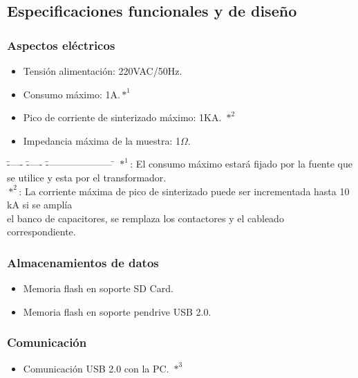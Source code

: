   \subsection{Especificaciones funcionales y de diseño}  
  
  \subsubsection{Aspectos eléctricos}
      \begin{itemize}
	\item Tensión alimentación: 220VAC/50Hz.
	\item Consumo máximo: 1A.$*^{1}$
	\item Pico de corriente de sinterizado máximo: 1KA. $*^{2}$
	\item Impedancia máxima de la muestra: 1$\Omega$. 
	\end{itemize}
     
    \begin{tabbing}
      \= ----- \= ----- \= --------------------- \= \kill
      \> $*^{1}$:\>	El consumo máximo estará fijado por la fuente que se utilice y esta por el transformador. \\
      \> $*^{2}$:\>	La corriente máxima de pico de sinterizado puede ser incrementada hasta 10 kA si se amplía\\
         	\>\>	el banco de capacitores, se remplaza los contactores y el cableado correspondiente.\\
     \end{tabbing}

    \subsubsection{Almacenamientos de datos}
      
      \begin{itemize}
	\item Memoria flash en soporte SD Card.
	\item Memoria flash en soporte pendrive USB 2.0.
      \end{itemize}

    \subsubsection{Comunicación}
      
      \begin{itemize}
	\item Comunicación USB 2.0 con la PC. $*^{3}$
      \end{itemize}
    
